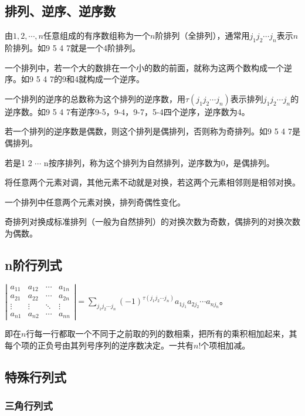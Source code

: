\documentclass[UTF8, 12pt]{ctexart}
\begin{document}
\subsection{排列、逆序、逆序数}

由$1,2,\cdots,n$任意组成的有序数组称为一个$n$阶排列（全排列），通常用$j_1j_2\cdots j_n$表示$n$阶排列。如9 5 4 7就是一个4阶排列。

一个排列中，若一个大的数排在一个小的数的前面，就称为这两个数构成一个逆序。如9 5 4 7的9和4就构成一个逆序。

一个排列的逆序的总数称为这个排列的逆序数，用$\tau(j_1j_2\cdots j_n)$表示排列$j_1j_2\cdots j_n$的逆序数。如9 5 4 7有逆序9-5，9-4，9-7，5-4四个逆序，逆序数为4。

若一个排列的逆序数是偶数，则这个排列是偶排列，否则称为奇排列。如9 5 4 7是偶排列。

若是1 2 $\cdots$ n按序排列，称为这个排列为自然排列，逆序数为0，是偶排列。

将任意两个元素对调，其他元素不动就是对换，若这两个元素相邻则是相邻对换。

一个排列中任意两个元素对换，排列奇偶性变化。

奇排列对换成标准排列（一般为自然排列）的对换次数为奇数，偶排列的对换次数为偶数。

\subsection{n阶行列式}

$
\left|\begin{array}{cccc} 
    a_{11} & a_{12} & \cdots & a_{1n} \\
    a_{21} & a_{22} & \cdots & a_{2n} \\
    \vdots & \vdots & \ddots & \vdots \\
    a_{n1} & a_{n2} & \cdots & a_{nn}
\end{array}\right| 
=\sum\limits_{j_1j_2\cdots j_n}(-1)^{\tau(j_1j_2\cdots j_n)}a_{1j_1}a_{2j_2}\cdots a_{nj_n}$。

即在$n$行每一行都取一个不同于之前取的列的数相乘，把所有的乘积相加起来，其每个项的正负号由其列号序列的逆序数决定。一共有$n!$个项相加减。

\subsection{特殊行列式}

\subsubsection{三角行列式}
\end{document}

